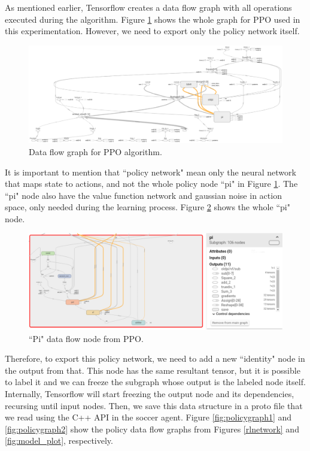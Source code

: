 As mentioned earlier, Tensorflow creates a data flow graph with all operations executed during the algorithm. Figure \ref{fig:dataflowgraph} shows the whole graph for PPO used in this experimentation. However, we need to export only the policy network itself.

\begin{figure}[!htbp]
	\centering
	\includegraphics[width=1.1\textwidth]{Cap5/dataflowgraph.eps}
	\caption{Data flow graph for PPO algorithm.
	}
	\label{fig:dataflowgraph}
\end{figure}

It is important to mention that ``policy network" mean only the neural network that maps state to actions, and not the whole policy node ``pi" in Figure \ref{fig:dataflowgraph}. The ``pi" node also have the value function network and gaussian noise in action space, only needed during the learning process. Figure \ref{fig:pigraph} shows the whole ``pi" node.

\begin{figure}[!htbp]
	\centering
	\includegraphics[width=1.1\textwidth]{Cap5/pigraph.eps}
	\caption{ ``Pi" data flow node from PPO.
	}
	\label{fig:pigraph}
\end{figure}

Therefore, to export this policy network, we need to add a new ``identity" node in the output from that. This node has the same resultant tensor, but it is possible to label it and we can freeze the subgraph whose output is the labeled node itself. Internally, Tensorflow will start freezing the output node and its dependencies, recursing until input nodes. Then, we save this data structure in a proto file that we read using the C++ API in the soccer agent. Figure \ref{fig:policygraph1} and \ref{fig:policygraph2} show the policy data flow graphs from Figures \ref{rlnetwork} and \ref{fig:model_plot}, respectively.



